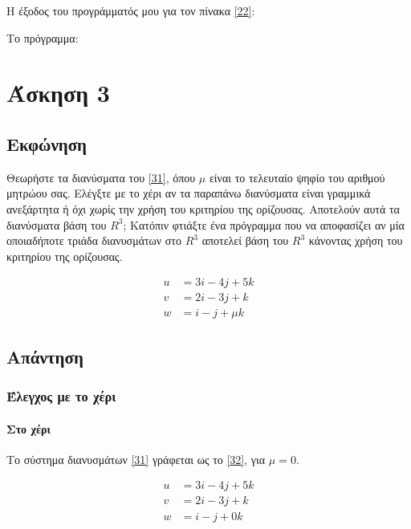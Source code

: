 \documentclass[12pt]{extreport}
\begin{document}
Η έξοδος του προγράμματός μου για τον πίνακα \eqref{22}:


Το πρόγραμμα:



\chapter{Άσκηση 3}
\section{Εκφώνηση}

Θεωρήστε τα διανύσματα του \eqref{31}, όπου $\mu$ είναι το τελευταίο ψηφίο του αριθμού μητρώου σας. Ελέγξτε με το χέρι αν τα παραπάνω διανύσματα είναι γραμμικά ανεξάρτητα ή όχι χωρίς την χρήση του κριτηρίου της ορίζουσας. Αποτελούν αυτά τα διανύσματα βάση του $R^{3}$; Κατόπιν φτιάξτε ένα πρόγραμμα που να αποφασίζει αν μία οποιαδήποτε τριάδα διανυσμάτων στο $R^{3}$ αποτελεί βάση του $R^{3}$ κάνοντας χρήση του κριτηρίου της ορίζουσας.

\begin{equation}%
    \begin{aligned}
        u & = 3i - 4j + 5k  \\
        v & = 2i - 3j + k   \\
        w & = i - j + \mu k
    \end{aligned}\label{31}
\end{equation}

\newpage
\section{Απάντηση}

\subsection{Έλεγχος με το χέρι}
\subsubsection{Στο χέρι}

Το σύστημα διανυσμάτων \eqref{31} γράφεται ως το \eqref{32}, για $\mu = 0$.

\begin{equation}%
    \begin{aligned}
        u & = 3i - 4j + 5k \\
        v & = 2i - 3j + k  \\
        w & = i - j + 0k
    \end{aligned}\label{32}
\end{equation}
\end{document}
